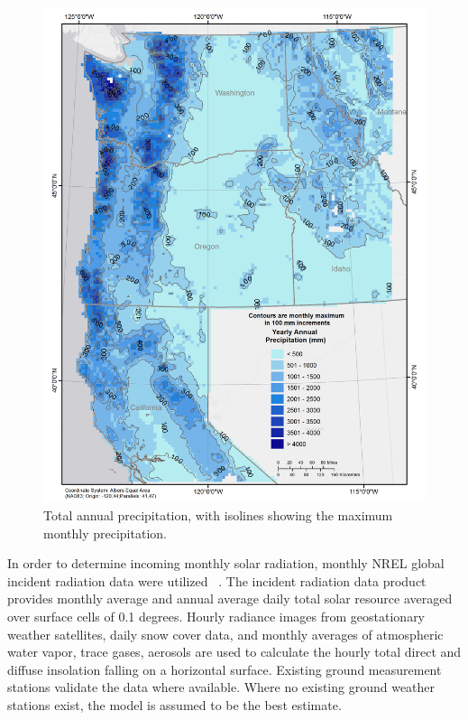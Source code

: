 \documentclass[preprint,review,12pt]{elsarticle}
\begin{document}
\begin{figure}[hp]
  \centering  
  \includegraphics[width=1.0\linewidth]{precip}  
\caption{Total annual precipitation, with isolines showing the maximum monthly precipitation.}
  \label{fig:precip}
\end{figure}

In order to determine incoming monthly solar radiation, monthly
\acf{NREL} global incident radiation data were
utilized ~\cite{Perez2002}.  The incident radiation data product
provides monthly average and annual average daily total solar resource
averaged over surface cells of 0.1 degrees.  Hourly radiance images
from geostationary weather satellites, daily snow cover data, and
monthly averages of atmospheric water vapor, trace gases, aerosols are
used to calculate the hourly total direct and diffuse insolation
falling on a horizontal surface.  Existing ground measurement stations
validate the data where available. Where no existing ground weather
stations exist, the model is assumed to be the best estimate.
\end{document}
